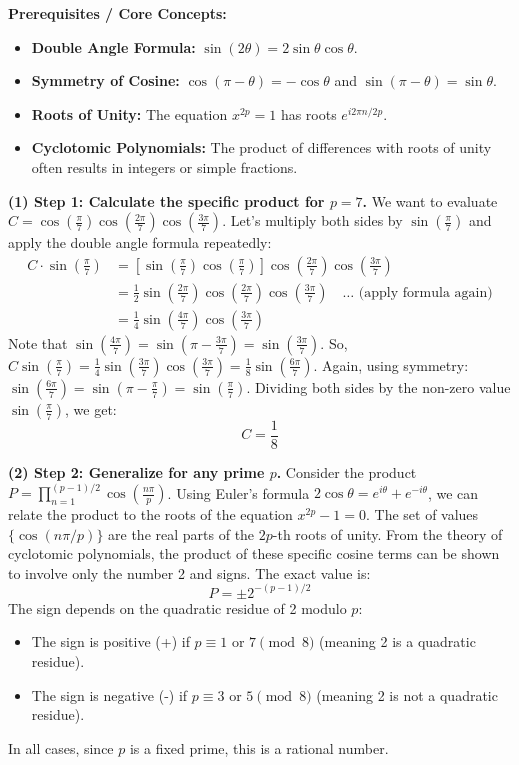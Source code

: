 \begin{solution}
\textbf{Prerequisites / Core Concepts:}
\begin{itemize}
    \item \textbf{Double Angle Formula:} $\sin(2\theta) = 2 \sin \theta \cos \theta$.
    \item \textbf{Symmetry of Cosine:} $\cos(\pi - \theta) = -\cos \theta$ and $\sin(\pi - \theta) = \sin \theta$.
    \item \textbf{Roots of Unity:} The equation $x^{2p} = 1$ has roots $e^{i2\pi n / 2p}$.
    \item \textbf{Cyclotomic Polynomials:} The product of differences with roots of unity often results in integers or simple fractions.
\end{itemize}

\textbf{(1) Step 1: Calculate the specific product for $p=7$.}
We want to evaluate $C = \cos(\frac{\pi}{7}) \cos(\frac{2\pi}{7}) \cos(\frac{3\pi}{7})$.
Let's multiply both sides by $\sin(\frac{\pi}{7})$ and apply the double angle formula repeatedly:
\begin{align*}
C \cdot \sin(\frac{\pi}{7}) &= \left[ \sin(\frac{\pi}{7}) \cos(\frac{\pi}{7}) \right] \cos(\frac{2\pi}{7}) \cos(\frac{3\pi}{7}) \\
&= \frac{1}{2} \sin(\frac{2\pi}{7}) \cos(\frac{2\pi}{7}) \cos(\frac{3\pi}{7}) \quad \dots \text{ (apply formula again)} \\
&= \frac{1}{4} \sin(\frac{4\pi}{7}) \cos(\frac{3\pi}{7})
\end{align*}
Note that $\sin(\frac{4\pi}{7}) = \sin(\pi - \frac{3\pi}{7}) = \sin(\frac{3\pi}{7})$.
So, $C \sin(\frac{\pi}{7}) = \frac{1}{4} \sin(\frac{3\pi}{7}) \cos(\frac{3\pi}{7}) = \frac{1}{8} \sin(\frac{6\pi}{7})$.
Again, using symmetry: $\sin(\frac{6\pi}{7}) = \sin(\pi - \frac{\pi}{7}) = \sin(\frac{\pi}{7})$.
Dividing both sides by the non-zero value $\sin(\frac{\pi}{7})$, we get:
\[ C = \frac{1}{8} \]

\textbf{(2) Step 2: Generalize for any prime $p$.}
Consider the product $P = \prod_{n=1}^{(p-1)/2} \cos(\frac{n\pi}{p})$.
Using Euler's formula $2 \cos \theta = e^{i\theta} + e^{-i\theta}$, we can relate the product to the roots of the equation $x^{2p} - 1 = 0$.
The set of values $\{\cos(n\pi/p)\}$ are the real parts of the $2p$-th roots of unity.
From the theory of cyclotomic polynomials, the product of these specific cosine terms can be shown to involve only the number 2 and signs.
The exact value is:
\[ P = \pm 2^{-(p-1)/2} \]
The sign depends on the quadratic residue of 2 modulo $p$:
\begin{itemize}
    \item The sign is positive (+) if $p \equiv 1$ or $7 \pmod 8$ (meaning 2 is a quadratic residue).
    \item The sign is negative (-) if $p \equiv 3$ or $5 \pmod 8$ (meaning 2 is not a quadratic residue).
\end{itemize}
In all cases, since $p$ is a fixed prime, this is a rational number.
\end{solution}

